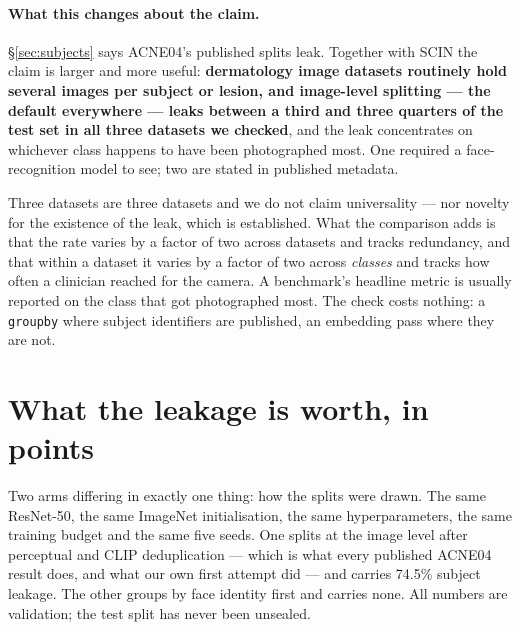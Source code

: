 \documentclass[11pt]{article}
\begin{document}
\paragraph{What this changes about the claim.}
\S\ref{sec:subjects} says ACNE04's published splits leak. Together with SCIN the claim is
larger and more useful: \textbf{dermatology image datasets routinely hold several images
per subject or lesion, and image-level splitting --- the default everywhere --- leaks
between a third and three quarters of the test set in all three datasets we checked}, and
the leak concentrates on whichever class happens to have been photographed most. One
required a face-recognition model to see; two are stated in published metadata.

Three datasets are three datasets and we do not claim universality --- nor novelty for the
existence of the leak, which is established. What the comparison adds is that the rate
varies by a factor of two across datasets and tracks redundancy, and that within a dataset
it varies by a factor of two across \emph{classes} and tracks how often a clinician reached
for the camera. A benchmark's headline metric is usually reported on the class that got
photographed most. The check costs nothing: a
\texttt{groupby} where subject identifiers are published, an embedding pass where they are
not.

\section{What the leakage is worth, in points}
\label{sec:cost}

Two arms differing in exactly one thing: how the splits were drawn. The same ResNet-50,
the same ImageNet initialisation, the same hyperparameters, the same training budget and
the same five seeds. One splits at the image level after perceptual and CLIP
deduplication --- which is what every published ACNE04 result does, and what our own first
attempt did --- and carries 74.5\% subject leakage. The other groups by face identity
first and carries none. All numbers are validation; the test split has never been
unsealed.
\end{document}
